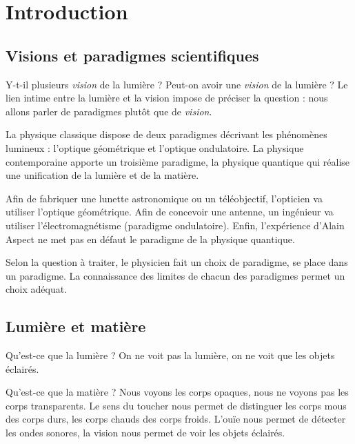 \chapter{Introduction}

\section{Visions et paradigmes scientifiques}

Y-t-il plusieurs {\it vision} de la lumière ? Peut-on avoir une {\it vision} de la lumière ? Le lien intime entre la lumière et la vision impose de préciser la question : nous allons parler de paradigmes plutôt que de {\it vision}.

La physique classique dispose de deux paradigmes décrivant les phénomènes lumineux : l'optique géométrique et l'optique ondulatoire.
La physique contemporaine apporte un troisième paradigme, la physique quantique qui réalise une unification de la lumière et de la matière.

Afin de fabriquer une lunette astronomique ou un téléobjectif, l'opticien va utiliser l'optique géométrique. Afin de concevoir une antenne, un ingénieur va utiliser l'électromagnétisme (paradigme ondulatoire). Enfin, l'expérience d'Alain Aspect ne met pas en défaut le paradigme de la physique quantique.

Selon la question à traiter, le physicien fait un choix de paradigme, se place dans un paradigme. La connaissance des limites de chacun des paradigmes permet un choix adéquat.

\section{Lumière et matière}

Qu'est-ce que la lumière ? On ne voit pas la lumière, on ne voit que les objets éclairés.

Qu'est-ce que la matière ? Nous voyons les corps opaques, nous ne voyons pas les corps transparents. Le sens du toucher nous permet de distinguer les corps mous des corps durs, les corps chauds des corps froids. L'ouïe nous permet de détecter les ondes sonores, la vision nous permet de voir les objets éclairés.

